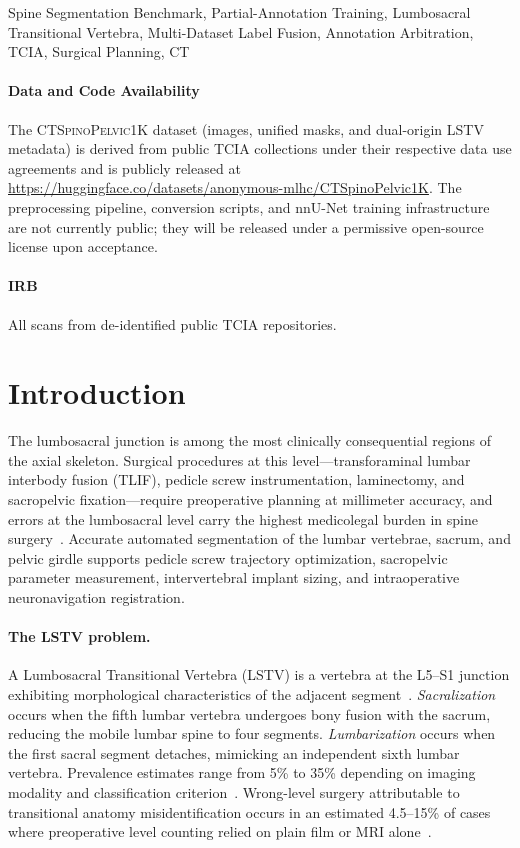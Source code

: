 \documentclass[pmlr]{jmlr}
\newcommand{\dataset}{\textsc{CTSpinoPelvic1K}}
\begin{document}
\begin{keywords}
Spine Segmentation Benchmark, Partial-Annotation Training,
Lumbosacral Transitional Vertebra, Multi-Dataset Label Fusion,
Annotation Arbitration, TCIA, Surgical Planning, CT
\end{keywords}

\paragraph*{Data and Code Availability}
The \dataset{} dataset (images, unified masks, and dual-origin
LSTV metadata) is derived from public TCIA collections under their
respective data use agreements and is publicly released at
\url{https://huggingface.co/datasets/anonymous-mlhc/CTSpinoPelvic1K}.
The preprocessing pipeline, conversion scripts, and nnU-Net training
infrastructure are not currently public; they will be released under
a permissive open-source license upon acceptance.

\paragraph*{IRB} All scans from de-identified public TCIA
repositories.

\section{Introduction}
\label{sec:intro}

The lumbosacral junction is among the most clinically consequential
regions of the axial skeleton.
Surgical procedures at this level---transforaminal lumbar interbody
fusion (TLIF), pedicle screw instrumentation, laminectomy, and
sacropelvic fixation---require preoperative planning at millimeter
accuracy, and errors at the lumbosacral level carry the highest
medicolegal burden in spine surgery~\citep{Carrino2011EffectImaging}.
Accurate automated segmentation of the lumbar vertebrae, sacrum, and
pelvic girdle supports pedicle screw trajectory optimization,
sacropelvic parameter measurement, intervertebral implant sizing,
and intraoperative neuronavigation registration.

\paragraph{The LSTV problem.}
A Lumbosacral Transitional Vertebra (LSTV) is a vertebra at the
L5--S1 junction exhibiting morphological characteristics of the
adjacent segment~\citep{CHAN1984LumbosacralDefects}.
\emph{Sacralization} occurs when the fifth lumbar vertebra undergoes
bony fusion with the sacrum, reducing the mobile lumbar spine to
four segments.
\emph{Lumbarization} occurs when the first sacral segment detaches,
mimicking an independent sixth lumbar vertebra.
Prevalence estimates range from 5\% to 35\% depending on imaging
modality and classification criterion~\citep{Sekharappa2014LumbosacralSignificance}.
Wrong-level surgery attributable to transitional anatomy
misidentification occurs in an estimated 4.5--15\% of cases where
preoperative level counting relied on plain film or MRI
alone~\citep{Konin2010LumbosacralRelevance}.
\end{document}

